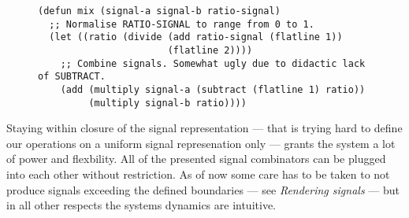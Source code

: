 \begin{figure}
\centering
\begin{verbatim}
(defun mix (signal-a signal-b ratio-signal)
  ;; Normalise RATIO-SIGNAL to range from 0 to 1.
  (let ((ratio (divide (add ratio-signal (flatline 1))
                       (flatline 2))))
    ;; Combine signals. Somewhat ugly due to didactic lack of SUBTRACT.
    (add (multiply signal-a (subtract (flatline 1) ratio))
         (multiply signal-b ratio))))
\end{verbatim}
\end{figure}

Staying within closure of the signal representation --- that is trying
hard to define our operations on a uniform signal represenation only ---
grants the system a lot of power and flexbility. All of the presented
signal combinators can be plugged into each other without restriction. As
of now some care has to be taken to not produce signals exceeding the
defined boundaries --- see \textit{Rendering signals} --- but in all
other respects the systems dynamics are intuitive.

